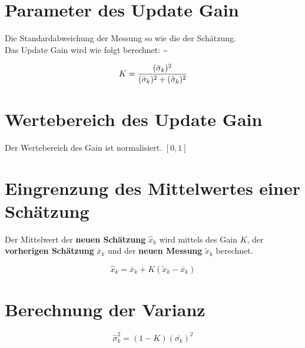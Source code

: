 \section{Parameter des Update Gain}
Die Standardabweichung der Messung so wie die der Schätzung.\\
Das Update Gain wird wie folgt berechnet: \~{}

\begin{equation}
K = \frac{(\bar{\sigma}_k)^2}{(\bar{\sigma}_k)^2 + (\tilde{\sigma}_k)^2}\\
\end{equation}

\section{Wertebereich des Update Gain}
Der Wertebereich des Gain ist normalisiert. $[0, 1]$ \\

\section{Eingrenzung des Mittelwertes einer Schätzung}

Der Mittelwert der \textbf{neuen Schätzung} $\hat{x}_k$ wird mittels des Gain $K$, der \textbf{vorherigen Schätzung} $\bar{x}_k$ und der \textbf{neuen Messung} $\tilde{x}_k$ berechnet.

\begin{equation}
\hat{x}_k = \bar{x}_k + K \left( \tilde{x}_k - \bar{x}_k \right) 
\end{equation}

\section{Berechnung der Varianz}
\begin{equation}
\hat{\sigma}^2_k = \left( 1 - K \right) (\bar{\sigma_k})^2
\end{equation}






